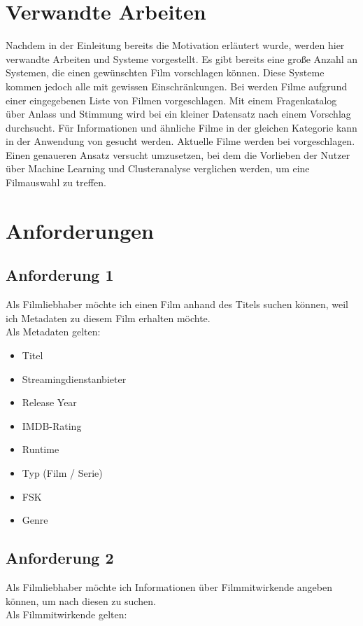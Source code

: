 \documentclass[conference]{IEEEtran}
\begin{document}
\section{Verwandte Arbeiten}

Nachdem in der Einleitung bereits die Motivation erläutert wurde, werden hier verwandte Arbeiten und Systeme vorgestellt.
Es gibt bereits eine große Anzahl an Systemen, die einen gewünschten Film vorschlagen können. Diese Systeme kommen jedoch alle mit gewissen Einschränkungen.
Bei \cite{cinemate} werden Filme aufgrund einer eingegebenen Liste von Filmen vorgeschlagen.
Mit einem Fragenkatalog über Anlass und Stimmung wird bei \cite{pickamovieforme} ein kleiner Datensatz nach einem Vorschlag durchsucht.
Für Informationen und ähnliche Filme in der gleichen Kategorie kann in der Anwendung von \cite{bestsimilar} gesucht werden.
Aktuelle Filme werden bei \cite{tastedive} vorgeschlagen.
Einen genaueren Ansatz versucht \cite{MovieGEN} umzusetzen, bei dem die Vorlieben der Nutzer über Machine Learning und Clusteranalyse verglichen werden, um eine Filmauswahl zu treffen.

\section{Anforderungen}

\subsection{Anforderung 1}
\label{1}
Als Filmliebhaber möchte ich einen Film anhand des Titels suchen können,
weil ich Metadaten zu diesem Film erhalten möchte.
\\
Als Metadaten gelten:
\begin{itemize}
	\item Titel
	\item Streamingdienstanbieter
	\item Release Year
	\item IMDB-Rating
	\item Runtime
	\item Typ (Film / Serie)
	\item FSK
	\item Genre
\end{itemize}


\subsection{Anforderung 2}
\label{2}
Als Filmliebhaber möchte ich Informationen über Filmmitwirkende angeben können,
um nach diesen zu suchen.
\\
Als Filmmitwirkende gelten:
\end{document}
